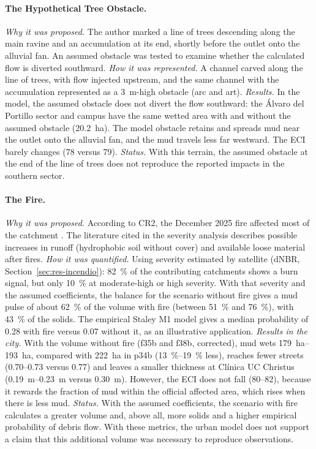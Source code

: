 \paragraph{The Hypothetical Tree Obstacle.} \emph{Why it was proposed.} The author marked a line of trees descending along the main ravine and an accumulation at its end, shortly before the outlet onto the alluvial fan. An assumed obstacle was tested to examine whether the calculated flow is diverted southward. \emph{How it was represented.} A channel carved along the line of trees, with flow injected upstream, and the same channel with the accumulation represented as a \SI{3}{m}-high obstacle (arc and art). \emph{Results.} In the model, the assumed obstacle does not divert the flow southward: the Álvaro del Portillo sector and campus have the same wetted area with and without the assumed obstacle (\SI{20.2}{ha}). The model obstacle retains and spreads mud near the outlet onto the alluvial fan, and the mud travels less far westward. The ECI barely changes (78 versus 79). \emph{Status.} With this terrain, the assumed obstacle at the end of the line of trees does not reproduce the reported impacts in the southern sector.

\paragraph{The Fire.} \emph{Why it was proposed.} According to CR2, the December 2025 fire affected most of the catchment \citep{cr2_2026}. The literature cited in the severity analysis describes possible increases in runoff (hydrophobic soil without cover) and available loose material after fires. \emph{How it was quantified.} Using severity estimated by satellite (dNBR, Section~\ref{sec:res-incendio}): \SI{82}{\percent} of the contributing catchments shows a burn signal, but only \SI{10}{\percent} at moderate-high or high severity. With that severity and the assumed coefficients, the balance for the scenario without fire gives a mud pulse of about \SI{62}{\percent} of the volume with fire (between \SI{51}{\percent} and \SI{76}{\percent}), with \SI{43}{\percent} of the solids. The empirical Staley M1 model gives a median probability of 0.28 with fire versus 0.07 without it, as an illustrative application. \emph{Results in the city.} With the volume without fire (f35b and f38b, corrected), mud wets \SIrange{179}{193}{ha}, compared with \SI{222}{ha} in p34b (\SIrange{13}{19}{\percent} less), reaches fewer streets (0.70--0.73 versus 0.77) and leaves a smaller thickness at Clínica UC Christus (\SIrange{0.19}{0.23}{m} versus \SI{0.30}{m}). However, the ECI does not fall (80--82), because it rewards the fraction of mud within the official affected area, which rises when there is less mud. \emph{Status.} With the assumed coefficients, the scenario with fire calculates a greater volume and, above all, more solids and a higher empirical probability of debris flow. With these metrics, the urban model does not support a claim that this additional volume was necessary to reproduce observations.

